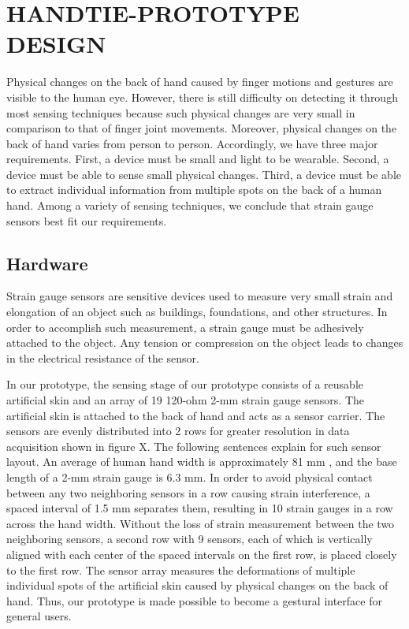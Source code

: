 \documentclass{sigchi}
\begin{document}
\section{HANDTIE-PROTOTYPE DESIGN}

Physical changes on the back of hand caused by finger motions and gestures are visible to the human eye. However, there is still difficulty on detecting it through most sensing techniques because such physical changes are very small in comparison to that of finger joint movements. Moreover, physical changes on the back of hand varies from person to person. Accordingly, we have three major requirements. First, a device must be small and light to be wearable. Second, a device must be able to sense small physical changes. Third, a device must be able to extract individual information from multiple spots on the back of a human hand. Among a variety of sensing techniques, we conclude that strain gauge sensors best fit our requirements.

\subsection{Hardware} 
Strain gauge sensors are sensitive devices used to measure very small strain and elongation of an object such as buildings, foundations, and other structures. In order to accomplish such measurement, a strain gauge must be adhesively attached to the object. Any tension or compression on the object leads to changes in the electrical resistance of the sensor.



In our prototype, the sensing stage of our prototype consists of a reusable artificial skin and an array of 19 120-ohm 2-mm strain gauge sensors. The artificial skin is attached to the back of hand and acts as a sensor carrier. The sensors are evenly distributed into 2 rows for greater resolution in data acquisition shown in figure X. The following sentences explain for such sensor layout. An average of human hand width is approximately 81 mm \cite{Kulaksiz2002257}, and the base length of a 2-mm strain gauge is 6.3 mm. In order to avoid physical contact between any two neighboring sensors in a row causing strain interference, a spaced interval of 1.5 mm separates them, resulting in 10 strain gauges in a row across the hand width. Without the loss of strain measurement between the two neighboring sensors, a second row with 9 sensors, each of which is vertically aligned with each center of the spaced intervals on the first row, is placed closely to the first row. The sensor array measures the deformations of multiple individual spots of the artificial skin caused by physical changes on the back of hand. Thus, our prototype is made possible to become a gestural interface for general users.
\end{document}
